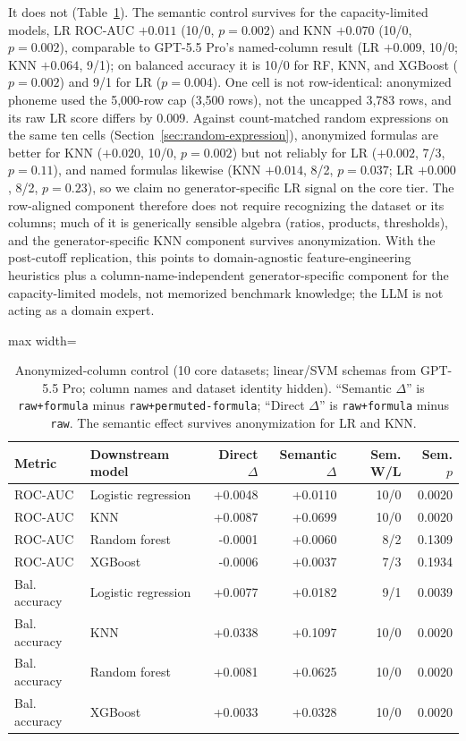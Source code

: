 It does not (Table~\ref{tab:anon}). The semantic control survives for the capacity-limited models, LR ROC-AUC \(+0.011\) (10/0, \(p = 0.002\)) and KNN \(+0.070\) (10/0, \(p = 0.002\)), comparable to GPT-5.5 Pro's named-column result (LR \(+0.009\), 10/0; KNN \(+0.064\), 9/1); on balanced accuracy it is 10/0 for RF, KNN, and XGBoost (\(p = 0.002\)) and 9/1 for LR (\(p = 0.004\)). One cell is not row-identical: anonymized phoneme used the 5,000-row cap (3,500 rows), not the uncapped 3,783 rows, and its raw LR score differs by 0.009. Against count-matched random expressions on the same ten cells (Section~\ref{sec:random-expression}), anonymized formulas are better for KNN (\(+0.020\), 10/0, \(p = 0.002\)) but not reliably for LR (\(+0.002\), 7/3, \(p = 0.11\)), and named formulas likewise (KNN \(+0.014\), 8/2, \(p = 0.037\); LR \(+0.000\), 8/2, \(p = 0.23\)), so we claim no generator-specific LR signal on the core tier. The row-aligned component therefore does not require recognizing the dataset or its columns; much of it is generically sensible algebra (ratios, products, thresholds), and the generator-specific KNN component survives anonymization. With the post-cutoff replication, this points to domain-agnostic feature-engineering heuristics plus a column-name-independent generator-specific component for the capacity-limited models, not memorized benchmark knowledge; the LLM is not acting as a domain expert.

\begin{table}[tbp]
\caption{Anonymized-column control (10 core datasets; linear/SVM schemas from GPT-5.5 Pro; column names and dataset identity hidden). ``Semantic $\Delta$'' is \texttt{raw+formula} minus \texttt{raw+permuted-formula}; ``Direct $\Delta$'' is \texttt{raw+formula} minus \texttt{raw}. The semantic effect survives anonymization for LR and KNN.}\label{tab:anon}
\centering
\small
\begin{adjustbox}{max width=\linewidth}
\begin{tabular}{llrrrr}
\toprule
Metric & Downstream model & Direct \(\Delta\) & Semantic \(\Delta\) & Sem. W/L & Sem. \(p\) \\
\midrule
ROC-AUC & Logistic regression & +0.0048 & +0.0110 & 10/0 & 0.0020 \\
ROC-AUC & KNN & +0.0087 & +0.0699 & 10/0 & 0.0020 \\
ROC-AUC & Random forest & -0.0001 & +0.0060 & 8/2 & 0.1309 \\
ROC-AUC & XGBoost & -0.0006 & +0.0037 & 7/3 & 0.1934 \\
\midrule
Bal. accuracy & Logistic regression & +0.0077 & +0.0182 & 9/1 & 0.0039 \\
Bal. accuracy & KNN & +0.0338 & +0.1097 & 10/0 & 0.0020 \\
Bal. accuracy & Random forest & +0.0081 & +0.0625 & 10/0 & 0.0020 \\
Bal. accuracy & XGBoost & +0.0033 & +0.0328 & 10/0 & 0.0020 \\
\bottomrule
\end{tabular}
\end{adjustbox}
\end{table}


